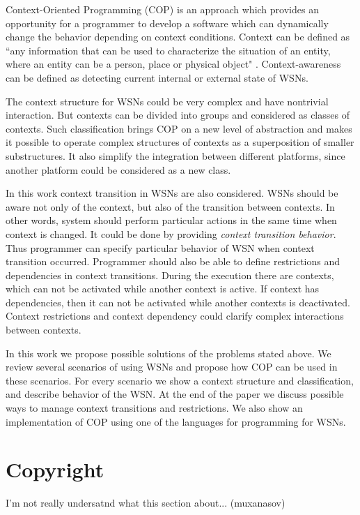 \documentclass{ubicomp-ext}
\begin{document}
Context-Oriented Programming (COP) \cite{hirschfeld08} is an approach which provides an opportunity for a programmer to develop a software which can dynamically change the behavior depending on context conditions. Context can be defined as ``any information that can be used to characterize the situation of an entity, where an entity can be a person, place or physical object" \cite{dey99}. Context-awareness can be defined as detecting current internal or external state of WSNs.

The context structure for WSNs could be very complex and have nontrivial interaction. But contexts can be divided into groups and considered as classes of contexts. Such classification brings COP on a new level of abstraction and makes it possible to operate complex structures of contexts as a superposition of smaller substructures. It also simplify the integration between different platforms, since another platform could be considered as a new class.

In this work context transition in WSNs are also considered. WSNs should be aware not only of the context, but also of the transition between contexts. In other words, system should perform particular actions in the same time when context is changed. It could be done by providing \textit{context transition behavior}. Thus programmer can specify particular behavior of WSN when context transition occurred. Programmer should also be able to define restrictions and dependencies in context transitions. During the execution there are contexts, which can not be activated while another context is active. If context has dependencies, then it can not be activated while another contexts is deactivated. Context restrictions and context dependency could clarify complex interactions between contexts.

In this work we propose possible solutions of the problems stated above. We review several scenarios of using WSNs and propose how COP can be used in these scenarios. For every scenario we show a context structure and classification, and describe behavior of the WSN. At the end of the paper we discuss possible ways to manage context transitions and restrictions. We also show an implementation of COP using one of the languages for programming for WSNs.

\section{Copyright}
I'm not really undersatnd what this section about... (muxanasov)
\end{document}
